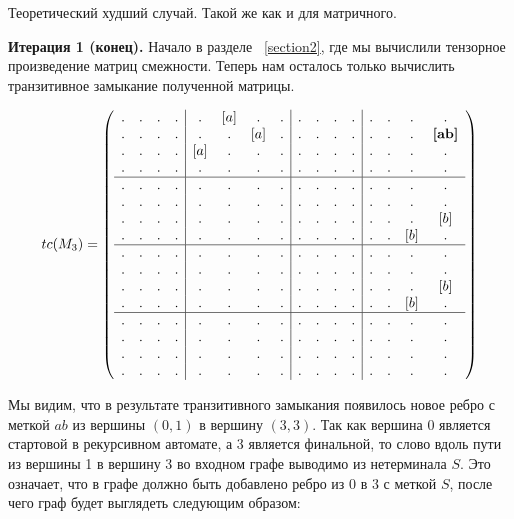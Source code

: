\begin{example}
Теоретический худший случай.
Такой же как и для матричного.

\textbf{Итерация 1 (конец).} Начало в разделе ~\ref{section2}, где мы вычислили тензорное произведение матриц смежности.
Теперь нам осталось только вычислить транзитивное замыкание полученной матрицы.
 
\begin{align}
tc(M_3) =
\left(\begin{array}{c c c c | c c c c | c c c c | c c c c } 
. & . & . & .  &  . & [a] & . & .  &  . & . & . & .  &  . & . & . & .\\
. & . & . & .  &  . & . & [a] & .  &  . & . & . & .  &  . & . & . & \textbf{[ab]}   \\
. & . & . & .  &  [a] & . & . & .  &  . & . & . & .  &  . & . & . & .   \\
. & . & . & .  &  . & . & . & .    &  . & . & . & .  &  . & . & . & .   \\
\hline
. & . & . & .  &  . & . & . & .    &  . & . & . & .  &  . & . & . & .   \\
. & . & . & .  &  . & . & . & .    &  . & . & . & .  &  . & . & . & .   \\
. & . & . & .  &  . & . & . & .    &  . & . & . & .  &  . & . & . & [b] \\
. & . & . & .  &  . & . & . & .    &  . & . & . & .  &  . & . & [b] & . \\
\hline
. & . & . & .  &  . & . & . & .    &  . & . & . & .  &  . & . & . & .   \\
. & . & . & .  &  . & . & . & .    &  . & . & . & .  &  . & . & . & .   \\
. & . & . & .  &  . & . & . & .    &  . & . & . & .  &  . & . & . & [b] \\
. & . & . & .  &  . & . & . & .    &  . & . & . & .  &  . & . & [b] & . \\
\hline
. & . & . & .  &  . & . & . & .    &  . & . & . & .  &  . & . & . & .   \\
. & . & . & .  &  . & . & . & .    &  . & . & . & .  &  . & . & . & .   \\
. & . & . & .  &  . & . & . & .    &  . & . & . & .  &  . & . & . & .   \\
. & . & . & .  &  . & . & . & .    &  . & . & . & .  &  . & . & . & . 
\end{array}\right)
\label{eq:graph_tm}
\end{align}

Мы видим, что в результате транзитивного замыкания появилось новое ребро с меткой $ab$ из вершины $(0,1)$ в вершину $(3,3)$.
Так как вершина 0 является стартовой в рекурсивном автомате, а 3 является финальной, то слово вдоль пути из вершины 1 в вершину 3 во входном графе выводимо из нетерминала $S$.
Это означает, что в графе должно быть добавлено ребро из $0$ в $3$ с меткой $S$, после чего граф будет выглядеть следующим образом:


\end{example}
